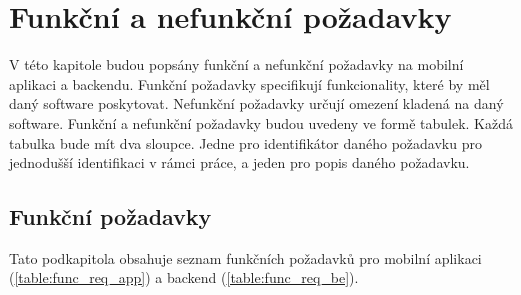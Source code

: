 \chapter{Funkční a nefunkční požadavky}

\begin{chapterabstract}
V této kapitole budou popsány funkční a nefunkční požadavky na mobilní aplikaci a backendu. Funkční požadavky specifikují funkcionality, které by měl daný software poskytovat. Nefunkční požadavky určují omezení kladená na daný software. Funkční a nefunkční požadavky budou uvedeny ve formě tabulek. Každá tabulka bude mít dva sloupce. Jedne pro identifikátor daného požadavku pro jednodušší identifikaci v rámci práce, a jeden pro popis daného požadavku.
\end{chapterabstract}

\section{Funkční požadavky}
Tato podkapitola obsahuje seznam funkčních požadavků pro mobilní aplikaci (\ref{table:func_req_app}) a backend (\ref{table:func_req_be}).

